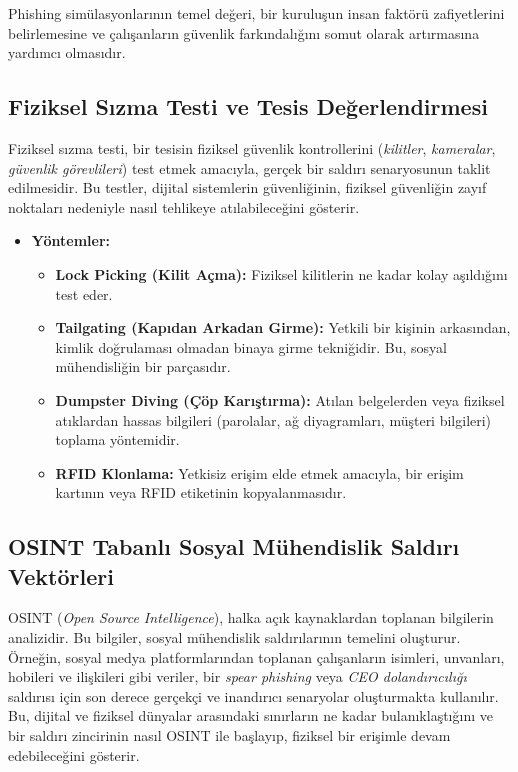 Phishing simülasyonlarının temel değeri, bir kuruluşun insan faktörü zafiyetlerini belirlemesine ve çalışanların güvenlik farkındalığını somut olarak artırmasına yardımcı olmasıdır.

\subsection{Fiziksel Sızma Testi ve Tesis Değerlendirmesi}

Fiziksel sızma testi, bir tesisin fiziksel güvenlik kontrollerini (\textit{kilitler}, \textit{kameralar}, \textit{güvenlik görevlileri}) test etmek amacıyla, gerçek bir saldırı senaryosunun taklit edilmesidir. Bu testler, dijital sistemlerin güvenliğinin, fiziksel güvenliğin zayıf noktaları nedeniyle nasıl tehlikeye atılabileceğini gösterir.

\begin{itemize}
\item \textbf{Yöntemler:}
\begin{itemize}
\item \textbf{Lock Picking (Kilit Açma):} Fiziksel kilitlerin ne kadar kolay aşıldığını test eder.
\item \textbf{Tailgating (Kapıdan Arkadan Girme):} Yetkili bir kişinin arkasından, kimlik doğrulaması olmadan binaya girme tekniğidir. Bu, sosyal mühendisliğin bir parçasıdır.
\item \textbf{Dumpster Diving (Çöp Karıştırma):} Atılan belgelerden veya fiziksel atıklardan hassas bilgileri (parolalar, ağ diyagramları, müşteri bilgileri) toplama yöntemidir.
\item \textbf{RFID Klonlama:} Yetkisiz erişim elde etmek amacıyla, bir erişim kartının veya RFID etiketinin kopyalanmasıdır.
\end{itemize}
\end{itemize}

\subsection{OSINT Tabanlı Sosyal Mühendislik Saldırı Vektörleri}

OSINT (\textit{Open Source Intelligence}), halka açık kaynaklardan toplanan bilgilerin analizidir. Bu bilgiler, sosyal mühendislik saldırılarının temelini oluşturur. Örneğin, sosyal medya platformlarından toplanan çalışanların isimleri, unvanları, hobileri ve ilişkileri gibi veriler, bir \textit{spear phishing} veya \textit{CEO dolandırıcılığı} saldırısı için son derece gerçekçi ve inandırıcı senaryolar oluşturmakta kullanılır. Bu, dijital ve fiziksel dünyalar arasındaki sınırların ne kadar bulanıklaştığını ve bir saldırı zincirinin nasıl OSINT ile başlayıp, fiziksel bir erişimle devam edebileceğini gösterir.

